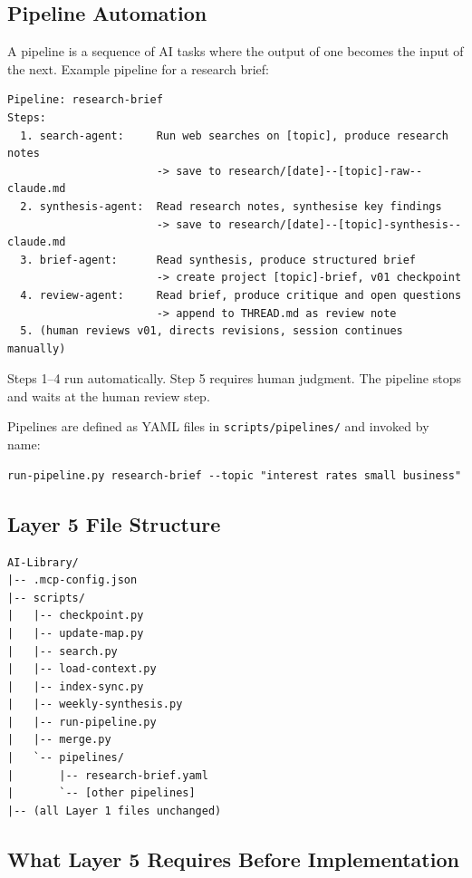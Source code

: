 \documentclass[12pt,letterpaper]{article}
\begin{document}
\subsection{Pipeline Automation}

A pipeline is a sequence of AI tasks where the output of one becomes
the input of the next. Example pipeline for a research brief:

\begin{lstlisting}
Pipeline: research-brief
Steps:
  1. search-agent:     Run web searches on [topic], produce research notes
                       -> save to research/[date]--[topic]-raw--claude.md
  2. synthesis-agent:  Read research notes, synthesise key findings
                       -> save to research/[date]--[topic]-synthesis--claude.md
  3. brief-agent:      Read synthesis, produce structured brief
                       -> create project [topic]-brief, v01 checkpoint
  4. review-agent:     Read brief, produce critique and open questions
                       -> append to THREAD.md as review note
  5. (human reviews v01, directs revisions, session continues manually)
\end{lstlisting}

Steps 1--4 run automatically. Step 5 requires human judgment.
The pipeline stops and waits at the human review step.

Pipelines are defined as YAML files in \texttt{scripts/pipelines/}
and invoked by name:

\begin{lstlisting}
run-pipeline.py research-brief --topic "interest rates small business"
\end{lstlisting}

\subsection{Layer 5 File Structure}

\begin{lstlisting}
AI-Library/
|-- .mcp-config.json
|-- scripts/
|   |-- checkpoint.py
|   |-- update-map.py
|   |-- search.py
|   |-- load-context.py
|   |-- index-sync.py
|   |-- weekly-synthesis.py
|   |-- run-pipeline.py
|   |-- merge.py
|   `-- pipelines/
|       |-- research-brief.yaml
|       `-- [other pipelines]
|-- (all Layer 1 files unchanged)
\end{lstlisting}

\subsection{What Layer 5 Requires Before Implementation}
\end{document}
